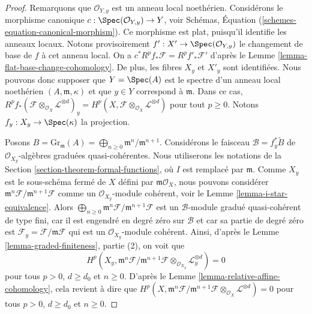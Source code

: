 \begin{proof}
Remarquons que $\mathcal{O}_{Y, y}$ est un anneau local noethérien.
Considérons le morphisme canonique
$c : \Spec(\mathcal{O}_{Y, y}) \to Y$, voir
Schémas, Équation (\ref{schemes-equation-canonical-morphism}).
Ce morphisme est plat, puisqu'il identifie les anneaux locaux.
Notons provisoirement $f' : X' \to \Spec(\mathcal{O}_{Y, y})$
le changement de base de $f$ à cet anneau local. On a
$c^*R^pf_*\mathcal{F} = R^pf'_*\mathcal{F}'$ d'après le
Lemme \ref{lemma-flat-base-change-cohomology}.
De plus, les fibres $X_y$ et $X'_y$ sont identifiées.
Nous pouvons donc supposer que $Y = \Spec(A)$ est le spectre
d'un anneau local noethérien $(A, \mathfrak m, \kappa)$ et que $y \in Y$
correspond à $\mathfrak m$. Dans ce cas,
$R^pf_*(\mathcal{F} \otimes_{\mathcal{O}_X} \mathcal{L}^{\otimes d})_y =
H^p(X, \mathcal{F} \otimes_{\mathcal{O}_X} \mathcal{L}^{\otimes d})$
pour tout $p \geq 0$. Notons $f_y : X_y \to \Spec(\kappa)$ la projection.

\medskip\noindent
Posons $B = \text{Gr}_\mathfrak m(A) =
\bigoplus_{n \geq 0} \mathfrak m^n/\mathfrak m^{n + 1}$.
Considérons le faisceau $\mathcal{B} = f_y^*\widetilde{B}$
de $\mathcal{O}_{X_y}$-algèbres graduées quasi-cohérentes.
Nous utiliserons les notations de la Section \ref{section-theorem-formal-functions},
où $I$ est remplacé par $\mathfrak m$.
Comme $X_y$ est le sous-schéma fermé de $X$ défini par
$\mathfrak m\mathcal{O}_X$, nous pouvons considérer
$\mathfrak m^n\mathcal{F}/\mathfrak m^{n + 1}\mathcal{F}$
comme un $\mathcal{O}_{X_y}$-module cohérent, voir le
Lemme \ref{lemma-i-star-equivalence}. Alors
$\bigoplus_{n \geq 0} \mathfrak m^n\mathcal{F}/\mathfrak m^{n + 1}\mathcal{F}$
est un $\mathcal{B}$-module gradué quasi-cohérent de type fini,
car il est engendré en degré zéro sur $\mathcal{B}$
et car sa partie de degré zéro est
$\mathcal{F}_y = \mathcal{F}/\mathfrak m \mathcal{F}$
qui est un $\mathcal{O}_{X_y}$-module cohérent.
Ainsi, d'après le Lemme \ref{lemma-graded-finiteness}, partie (2),
on voit que
$$
H^p(X_y, \mathfrak m^n \mathcal{F}/ \mathfrak m^{n + 1}\mathcal{F}
\otimes_{\mathcal{O}_{X_y}} \mathcal{L}_y^{\otimes d}) = 0
$$
pour tous $p > 0$, $d \geq d_0$ et $n \geq 0$. D'après le
Lemme \ref{lemma-relative-affine-cohomology},
cela revient à dire que
$
H^p(X, \mathfrak m^n \mathcal{F}/ \mathfrak m^{n + 1}\mathcal{F}
\otimes_{\mathcal{O}_X} \mathcal{L}^{\otimes d}) = 0
$
pour tous $p > 0$, $d \geq d_0$ et $n \geq 0$.


\end{proof}
